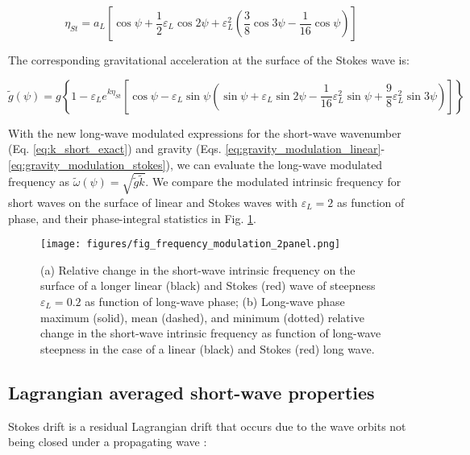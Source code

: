 \documentclass[draft]{agujournal2019}
\begin{document}
\begin{equation}
\label{eq:eta_stokes}
\eta_{St} = a_L \left[
  \cos{\psi} +
  \dfrac{1}{2} \varepsilon_L \cos{2\psi} +
  \varepsilon_L^2 \left( \dfrac{3}{8} \cos{3\psi} - \dfrac{1}{16} \cos{\psi} \right)
\right]
\end{equation}

The corresponding gravitational acceleration at the surface of the Stokes wave
is:

\begin{equation}
\label{eq:gravity_modulation_stokes}
\widetilde{g}(\psi) =
g \left\{
  1 - \varepsilon_L e^{k \eta_{St}}
  \left[ \cos{\psi} -
    \varepsilon_L \sin{\psi} \left(
      \sin{\psi}
      + \varepsilon_L \sin{2\psi}
      - \dfrac{1}{16} \varepsilon_L^2 \sin{\psi}
      + \dfrac{9}{8} \varepsilon_L^2 \sin{3\psi}
    \right)
  \right]
\right\}
\end{equation}

With the new long-wave modulated expressions for the short-wave wavenumber
(Eq. \ref{eq:k_short_exact}) and gravity
(Eqs. \ref{eq:gravity_modulation_linear}-\ref{eq:gravity_modulation_stokes}),
we can evaluate the long-wave modulated frequency as
$\widetilde{\omega}(\psi) = \sqrt{\widetilde{g} \widetilde{k}}$.
We compare the modulated intrinsic frequency for short waves on the surface of
linear and Stokes waves with $\varepsilon_L=2$ as function of phase, and their
phase-integral statistics in Fig. \ref{fig:frequency_modulation}.

\begin{figure}[h]
\label{fig:frequency_modulation}
\centering
\texttt{[image: figures/fig\_frequency\_modulation\_2panel.png]}
\caption{
  (a) Relative change in the short-wave intrinsic frequency on the surface of a
  longer linear (black) and Stokes (red) wave of steepness $\varepsilon_L = 0.2$
  as function of long-wave phase;
  (b) Long-wave phase maximum (solid), mean (dashed), and minimum (dotted)
  relative change in the short-wave intrinsic frequency as function of long-wave
  steepness in the case of a linear (black) and Stokes (red) long wave.
}
\end{figure}

\subsection{Lagrangian averaged short-wave properties}

Stokes drift is a residual Lagrangian drift that occurs due to the wave orbits
not being closed under a propagating wave
\cite{stokes1847,kenyon1969stokes,van2018stokes}:
\end{document}
